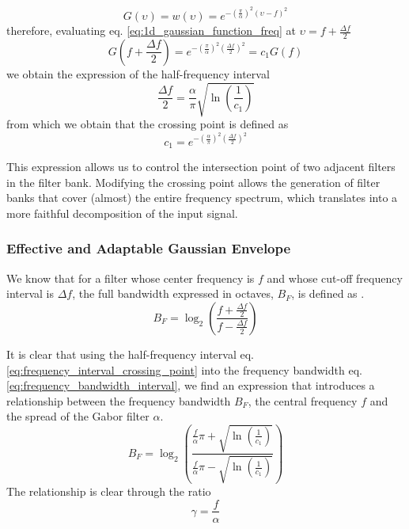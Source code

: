 \begin{equation}\label{eq:1d_gaussian_function_freq}
    G(\upsilon) = w(\upsilon) = e ^{-\left(\frac{\pi}{\alpha}\right) ^{2} (\upsilon-f)^2}
\end{equation}
therefore, evaluating eq. \eqref{eq:1d_gaussian_function_freq} at $\upsilon = f + \frac{\Delta f}{2}$
\begin{equation}\label{eq:constant_crossing_point}
    G\left(f + \frac{\Delta f}{2}\right) = e^{-\left(\frac{\pi}{\alpha}\right)^2 \left(\frac{\Delta f}{2}\right)^2} = c_1 G(f) 
\end{equation}
we obtain the expression of the half-frequency interval 
\begin{equation}\label{eq:frequency_interval_crossing_point}
    \frac{\Delta f}{2} = \frac{\alpha}{\pi}\sqrt{\ln \left(\frac{1}{c_1}\right)}
\end{equation}
from which we obtain that the crossing point is defined as
\begin{equation}\label{eq:crossing_point}
    c_1 = e^{-\left(\frac{\alpha}{\pi} \right)^2 \left(\frac{\Delta f}{2}\right)^2 }
\end{equation}

This expression allows us to control the intersection point of two adjacent filters in the filter bank. Modifying the crossing point allows the generation of filter banks that cover (almost) the entire frequency spectrum, which translates into a more faithful decomposition of the input signal.

\subsubsection{Effective and Adaptable Gaussian Envelope}
We know that for a filter whose center frequency is $f$ and whose cut-off frequency interval is $\Delta f$, the full bandwidth expressed in octaves, $B_F$, is defined as \citep{Daugman:JOSA:1985a}.
\begin{equation}\label{eq:frequency_bandwidth_interval}
    B_F = \log_2 \left( \frac{f + \frac{\Delta f}{2} }{f - \frac{\Delta f}{2}} \right)
\end{equation}

It is clear that using the half-frequency interval eq. \eqref{eq:frequency_interval_crossing_point} into the frequency bandwidth eq. \eqref{eq:frequency_bandwidth_interval}, we find an expression that introduces a relationship between the frequency bandwidth $B_F$, the central frequency $f$ and the spread of the Gabor filter $\alpha$.
\begin{equation}\label{eq:frequency_bandwidth}
    B_F = \log_2 \left( \frac{ \frac{f}{\alpha} \pi + \sqrt{\ln \left(\frac{1}{c_1}\right)} }{ \frac{f}{\alpha} \pi - \sqrt{\ln \left(\frac{1}{c_1}\right)} } \right)
\end{equation}
The relationship is clear through the ratio 
\begin{equation}\label{eq:gamma_ratio}
    \gamma = \frac{f}{\alpha}
\end{equation}

